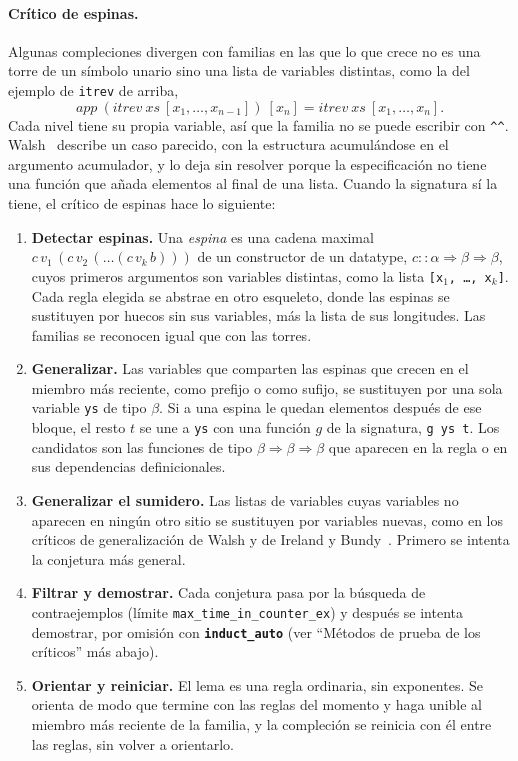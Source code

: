 \documentclass[11pt,a4paper]{article}
\newcommand{\isa}[1]{\texttt{#1}}
\newcommand{\cmd}[1]{\textbf{\texttt{#1}}}
\theoremstyle{definition}
\theoremstyle{remark}
\begin{document}
\paragraph{Crítico de espinas.}
Algunas compleciones divergen con familias en las que lo que crece no es una torre
de un símbolo unario sino una lista de variables distintas, como la del ejemplo de
\isa{itrev} de arriba,
\[
  \mathit{app}\ (\mathit{itrev}\ \mathit{xs}\ [x_1,\ldots,x_{n-1}])\ [x_n] =
    \mathit{itrev}\ \mathit{xs}\ [x_1,\ldots,x_n].
\]
Cada nivel tiene su propia variable, así que la familia no se puede escribir con
\isa{\textasciicircum\textasciicircum}. Walsh~\cite{walsh} describe un caso
parecido, con la estructura acumulándose en el argumento acumulador, y lo deja sin
resolver porque la especificación no tiene una función que añada elementos al
final de una lista. Cuando la signatura sí la tiene, el crítico de espinas hace lo
siguiente:
\begin{enumerate}[nosep]
  \item \textbf{Detectar espinas.} Una \emph{espina} es una cadena maximal
        $c\,v_1\,(c\,v_2\,(\dots(c\,v_k\,b)))$ de un constructor de un datatype,
        $c :: \alpha \Rightarrow \beta \Rightarrow \beta$, cuyos primeros
        argumentos son variables distintas, como la lista
        \isa{[x$_1$, \ldots, x$_k$]}. Cada regla elegida se abstrae en otro
        esqueleto, donde las espinas se sustituyen por huecos sin sus variables,
        más la lista de sus longitudes. Las familias se reconocen igual que con las
        torres.
  \item \textbf{Generalizar.} Las variables que comparten las espinas que crecen
        en el miembro más reciente, como prefijo o como sufijo, se sustituyen por
        una sola variable \isa{ys} de tipo $\beta$. Si a una espina le quedan
        elementos después de ese bloque, el resto $t$ se une a \isa{ys} con una
        función $g$ de la signatura, \isa{g ys t}. Los candidatos son las funciones
        de tipo $\beta \Rightarrow \beta \Rightarrow \beta$ que aparecen en la regla
        o en sus dependencias definicionales.
  \item \textbf{Generalizar el sumidero.} Las listas de variables cuyas variables
        no aparecen en ningún otro sitio se sustituyen por variables nuevas, como en
        los críticos de generalización de Walsh y de Ireland y
        Bundy~\cite{ireland-bundy}. Primero se intenta la conjetura más general.
  \item \textbf{Filtrar y demostrar.} Cada conjetura pasa por la búsqueda de
        contraejemplos (límite \isa{max\_time\_in\_counter\_ex}) y después se
        intenta demostrar, por omisión con \cmd{induct\_auto} (ver ``Métodos de
        prueba de los críticos'' más abajo).
  \item \textbf{Orientar y reiniciar.} El lema es una regla ordinaria, sin
        exponentes. Se orienta de modo que termine con las reglas del momento y
        haga unible al miembro más reciente de la familia, y la compleción se
        reinicia con él entre las reglas, sin volver a orientarlo.
\end{enumerate}
\end{document}

